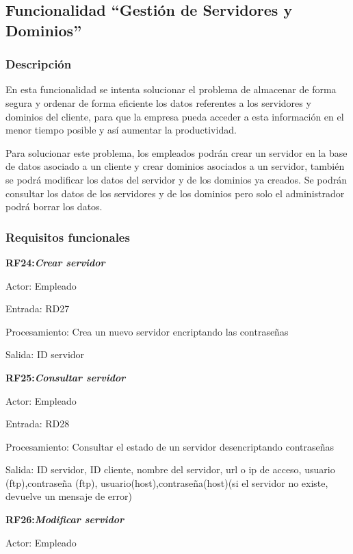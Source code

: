 \documentclass[paper=a4, fontsize=11pt, spanish]{scrartcl}
\begin{document}
\subsection{Funcionalidad “Gestión de Servidores y Dominios”}

\subsubsection{Descripción}
\setlength{\parindent}{3em} En esta funcionalidad se intenta solucionar el problema de almacenar de forma segura y ordenar de forma eficiente los datos referentes a los servidores y dominios del cliente, para que la empresa pueda acceder a esta información en el menor tiempo posible y así aumentar la productividad.

Para solucionar este problema, los empleados podrán crear un servidor en la base de datos asociado a un cliente y crear dominios asociados a un servidor, también se podrá modificar los datos del servidor y de los dominios ya creados. Se podrán consultar los datos de los servidores y de los dominios pero solo el administrador podrá borrar los datos.

\subsubsection{Requisitos funcionales}
\setlength{\parindent}{0em}
\textbf{RF24:\textit{Crear servidor}}
\setlength{\parindent}{3em}

Actor: Empleado

Entrada: RD27

Procesamiento: Crea un nuevo servidor encriptando las contraseñas

Salida: ID servidor

\setlength{\parindent}{0em}
\textbf{RF25:\textit{Consultar servidor}}
\setlength{\parindent}{3em}

Actor: Empleado

Entrada: RD28

Procesamiento: Consultar el estado de un servidor desencriptando contraseñas

Salida: ID servidor, ID cliente, nombre del servidor, url o ip de acceso, usuario (ftp),contraseña (ftp), usuario(host),contraseña(host)(si el servidor no existe, devuelve un mensaje de error)

\setlength{\parindent}{0em}
\textbf{RF26:\textit{Modificar servidor}}
\setlength{\parindent}{3em}

Actor: Empleado
\end{document}
